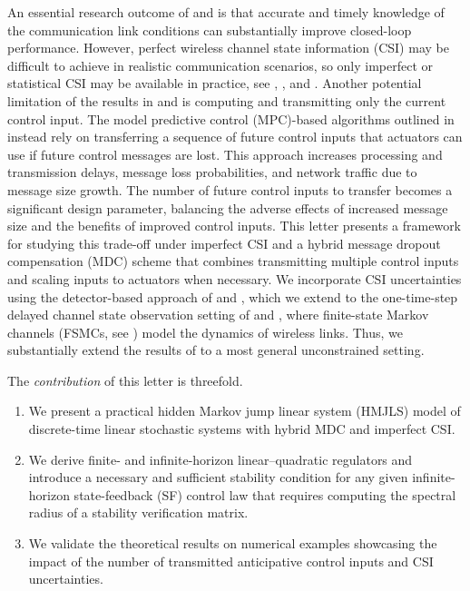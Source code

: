\documentclass[journal,twoside,web]{ieeecolor}
\begin{document}
An essential research outcome of \cite{yZL-2025-automatica} and \cite{impicciatore2024tac} is that accurate and timely knowledge of the communication link conditions can substantially improve closed-loop performance. However, perfect wireless channel state information (CSI) may be difficult to achieve in realistic communication scenarios, so only imperfect or statistical CSI may be available in practice, see \cite{zheng2022survey}, \cite{pourkabirian2021robust}, and \cite{akgun2024interference}. Another potential limitation of the results in \cite{yZL-2025-automatica} and \cite{impicciatore2024tac} is computing and transmitting only the current control input. The model predictive control (MPC)-based algorithms outlined in \cite{pezzutto2024arc} instead rely on transferring a sequence of future control inputs that actuators can use if future control messages are lost. This approach increases processing and transmission delays, message loss probabilities, and network traffic due to message size growth. The number of future control inputs to transfer becomes a significant design parameter, balancing the adverse effects of increased message size and the benefits of improved control inputs. This letter presents a framework for studying this trade-off under imperfect CSI and a hybrid message dropout compensation (MDC) scheme that combines transmitting multiple control inputs and scaling inputs to actuators when necessary.
We incorporate CSI uncertainties using the detector-based approach of \cite{costa2015detector} and \cite{deoliveira2018mixed}, which we extend to the one-time-step delayed channel state observation setting of \cite{yZL-2025-automatica} and \cite{impicciatore2024tac}, where finite-state Markov channels (FSMCs, see \cite{sadeghi2008finite}) model the dynamics of wireless links. Thus, we substantially extend the results of \cite{yZL-2025-automatica} to a most general unconstrained setting.

The \textit{contribution} of this letter is threefold.
\begin{enumerate}
    \item We present a practical hidden Markov jump linear system (HMJLS) model of discrete-time linear stochastic systems with hybrid MDC and imperfect CSI.
    \item We derive finite- and infinite-horizon linear--quadratic regulators and introduce a necessary and sufficient stability condition for any given infinite-horizon state-feedback (SF) control law that requires computing the spectral radius of a stability verification matrix.
    \item We validate the theoretical results on numerical examples showcasing the impact of the number of transmitted anticipative control inputs and CSI uncertainties.
\end{enumerate}
\end{document}

